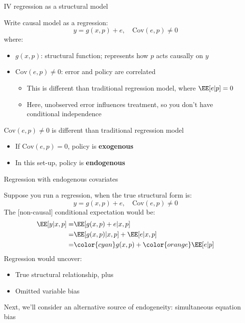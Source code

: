 \documentclass[compress, 8pt]{beamer}
\begin{document}
\begin{frame}{IV regression as a structural model}

Write causal model as a regression:
\begin{equation*}
    y = g(x, p) + e, \quad \text{Cov} (e, p) \neq 0
\end{equation*}
where:
\begin{itemize}
    \item $g(x, p)$: structural function; represents how $p$ acts causally on $y$
    \item $\text{Cov} (e, p) \neq 0$: error and policy are correlated
    \begin{itemize}
        \item This is different than traditional regression model, where $\EE [e \vert p] = 0$
        \item Here, unobserved error influences treatment, so you don't have conditional independence
    \end{itemize}
\end{itemize}

\vspace{3ex}
$\text{Cov} (e, p) \neq 0$ is different than traditional regression model
\begin{itemize}
    \item If $\text{Cov} (e, p) = 0$, policy is \textbf{exogenous}
    \item In this set-up, policy is \textbf{endogenous}
\end{itemize}

\end{frame}

\begin{frame}{Regression with endogenous covariates}

Suppose you run a regression, when the true structural form is: 
\begin{equation*}
    y = g(x, p) + e, \quad \text{Cov} (e, p) \neq 0
\end{equation*}
The [non-causal] conditional expectation would be:
\begin{align*}
    \EE [y \vert x, p] =& \EE [g(x, p) + e \vert x, p] \\
    =& \EE [g(x, p) \vert x, p] + \EE [e \vert x, p] \\
    =& {\color{cyan} g(x, p)} + {\color{orange} \EE [e \vert p]}
\end{align*}
Regression would uncover:
\begin{itemize}
    \item {\color{cyan} True structural relationship}, plus
    \item {\color{orange} Omitted variable bias}
\end{itemize}
Next, we'll consider an alternative source of endogeneity: simultaneous equation bias

\end{frame}
\end{document}
